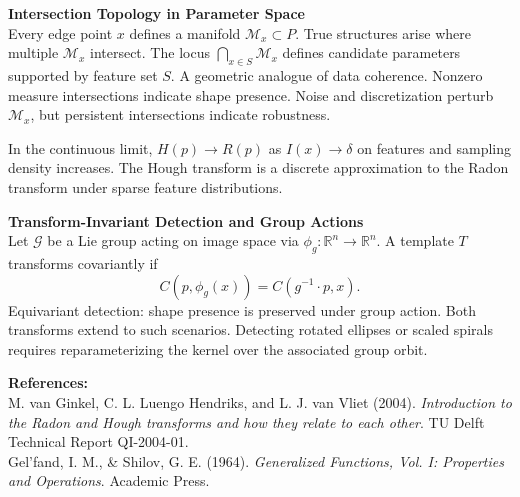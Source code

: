 \begin{technical}
\textbf{Intersection Topology in Parameter Space}\\[0.5em]
Every edge point $x$ defines a manifold $\mathcal{M}_x \subset P$. True structures arise where multiple $\mathcal{M}_x$ intersect. The locus $\bigcap_{x \in S} \mathcal{M}_x$ defines candidate parameters supported by feature set $S$. A geometric analogue of data coherence. Nonzero measure intersections indicate shape presence. Noise and discretization perturb $\mathcal{M}_x$, but persistent intersections indicate robustness.

In the continuous limit, $H(p) \to R(p)$ as $I(x) \to \delta$ on features and sampling density increases. The Hough transform is a discrete approximation to the Radon transform under sparse feature distributions.

\textbf{Transform-Invariant Detection and Group Actions}\\[0.5em]
Let $\mathcal{G}$ be a Lie group acting on image space via $\phi_g: \mathbb{R}^n \to \mathbb{R}^n$. A template $T$ transforms covariantly if
\[
C(p, \phi_g(x)) = C(g^{-1} \cdot p, x).
\]
Equivariant detection: shape presence is preserved under group action. Both transforms extend to such scenarios. Detecting rotated ellipses or scaled spirals requires reparameterizing the kernel over the associated group orbit.

\vspace{0.5em}
\textbf{References:}\\[0.5em]
M. van Ginkel, C. L. Luengo Hendriks, and L. J. van Vliet (2004). \textit{Introduction to the Radon and Hough transforms and how they relate to each other}. TU Delft Technical Report QI-2004-01.\\
Gel’fand, I. M., \& Shilov, G. E. (1964). \textit{Generalized Functions, Vol. I: Properties and Operations}. Academic Press.
\end{technical}
